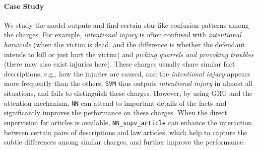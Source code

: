 \paragraph{Case Study}
We study the model outputs and find certain star-like confusion patterns among the charges. For example, \emph{intentional injury} %
is  often  confused with %
\emph{intentional homicide} (when the victim is dead, and the difference is %
 whether the defendant intends to kill  or just hurt the victim) and \emph{picking quarrels and provoking troubles} 
(there may also exist injuries here). 
These charges usually share similar fact descriptions, e.g., how the injuries are caused, and the \emph{intentional injury}  appears more frequently than the others,  \texttt{SVM} thus  outputs  \emph{intentional injury} in almost all situations, and  fails to distinguish these charges.  
However, by using GRU and the attention mechanism, \texttt{NN} can attend to important details of the facts and significantly improves the performance on these charges. 
When the direct supervision for articles is available,  \texttt{NN\_supv\_article}  can enhance the interaction between certain pairs of descriptions and law articles, which help to capture the subtle differences among similar charges,  and further improve the performance. 



